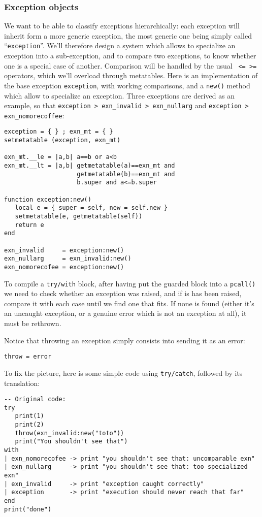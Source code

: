 \subsubsection{Exception objects}
We want to be able to classify exceptions hierarchically: each
exception will inherit form a more generic exception, the most generic
one being simply called ``{\tt exception}''. We'll therefore design a
system which allows to specialize an exception into a sub-exception,
and to compare two exceptions, to know whether one is a special case
of another. Comparison will be handled by the usual {\tt< > <= >=}
operators, which we'll overload through metatables. Here is an
implementation of the base exception {\tt exception}, with working
comparisons, and a {\tt new()} method which allow to specialize an
exception. Three exceptions are derived as an example, so that
{\tt exception > exn\_invalid > exn\_nullarg} and {\tt exception >
  exn\_nomorecoffee}:

\begin{verbatim}
exception = { } ; exn_mt = { } 
setmetatable (exception, exn_mt)

exn_mt.__le = |a,b| a==b or a<b 
exn_mt.__lt = |a,b| getmetatable(a)==exn_mt and 
                    getmetatable(b)==exn_mt and
                    b.super and a<=b.super

function exception:new()
   local e = { super = self, new = self.new }
   setmetatable(e, getmetatable(self))
   return e
end

exn_invalid     = exception:new()
exn_nullarg     = exn_invalid:new()
exn_nomorecofee = exception:new()
\end{verbatim}

To compile a {\tt try/with} block, after having put the guarded block
into a {\tt pcall()} we need to check whether an exception was raised,
and if is has been raised, compare it with each case until we find one
that fits. If none is found (either it's an uncaught exception, or a
genuine error which is not an exception at all), it must be rethrown. 

Notice that throwing an exception simply consists into sending it as
an error:
\begin{verbatim}
throw = error
\end{verbatim}

To fix the picture, here is some simple code using {\tt try/catch},
followed by its translation:

\begin{verbatim}
-- Original code:
try
   print(1)
   print(2)
   throw(exn_invalid:new("toto"))
   print("You shouldn't see that")
with
| exn_nomorecofee -> print "you shouldn't see that: uncomparable exn"
| exn_nullarg     -> print "you shouldn't see that: too specialized exn"
| exn_invalid     -> print "exception caught correctly"
| exception       -> print "execution should never reach that far"
end 
print("done")
\end{verbatim}

